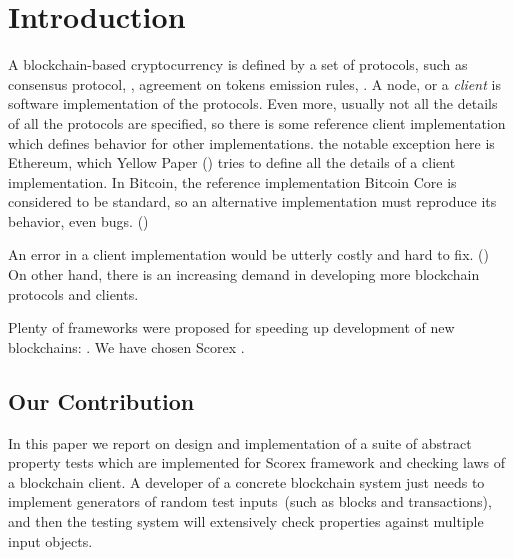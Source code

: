 
\section{Introduction}

A blockchain-based cryptocurrency is defined by a set of protocols, such as consensus protocol, , agreement on tokens emission rules, . A node, or a {\em client} is software implementation of the protocols. Even more, usually not all the details of all the protocols are specified, so there is some reference client implementation which defines behavior for other implementations. the notable exception here is Ethereum, which Yellow Paper () tries to define all the details of a client implementation. In Bitcoin, the reference implementation Bitcoin Core is considered to be standard, so an alternative implementation must reproduce its behavior, even bugs. ()

An error in a client implementation would be utterly costly and hard to fix. () On other hand, there is an increasing demand in developing more blockchain protocols and clients. 

Plenty of frameworks were proposed for speeding up development of new blockchains: . We have chosen Scorex .

\subsection{Our Contribution}

In this paper we report on design and implementation of a suite of abstract property tests which are implemented for Scorex framework and checking laws of a blockchain client. A developer of a concrete blockchain system just needs to implement generators of random test inputs~(such as blocks and transactions), and then the testing system will extensively check properties against multiple input objects.



